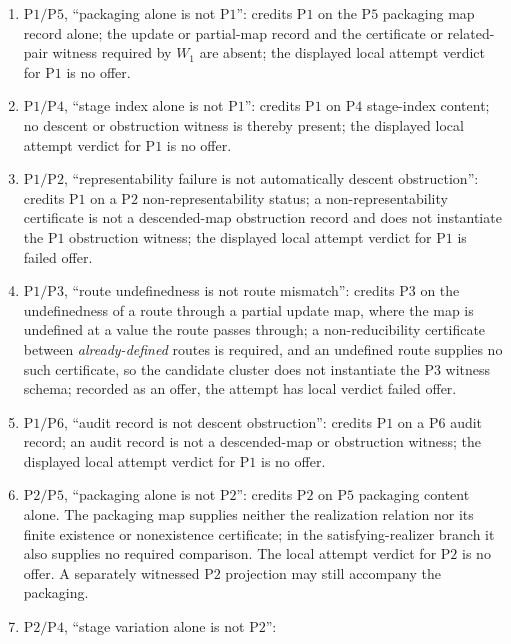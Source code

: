 \documentclass[11pt]{article}
\theoremstyle{definition}
\newcommand{\Pone}{\ensuremath{\mathrm{P1}}}
\newcommand{\Ptwo}{\ensuremath{\mathrm{P2}}}
\newcommand{\Pthree}{\ensuremath{\mathrm{P3}}}
\newcommand{\Pfour}{\ensuremath{\mathrm{P4}}}
\newcommand{\Pfive}{\ensuremath{\mathrm{P5}}}
\newcommand{\Psix}{\ensuremath{\mathrm{P6}}}
\begin{document}
\begin{enumerate}[topsep=2pt,itemsep=2pt,label=\textup{(\arabic*)}]
  \item \(\Pone{}/\Pfive{}\), ``packaging alone is not \Pone{}'': credits
    \Pone{} on the \Pfive{} packaging map record alone; the update or partial-map record and the
    certificate or related-pair witness required by \(W_1\) are absent; the displayed local attempt verdict for \Pone{}
    is no offer.
  \item \(\Pone{}/\Pfour{}\), ``stage index alone is not \Pone{}'': credits
    \Pone{} on \Pfour{} stage-index content; no descent or obstruction witness
    is thereby present; the displayed local attempt verdict for \Pone{} is no offer.
  \item \(\Pone{}/\Ptwo{}\), ``representability failure is not automatically
    descent obstruction'': credits \Pone{} on a \Ptwo{} non-representability
    status; a non-representability certificate is not a descended-map
    obstruction record and does not instantiate the \Pone{} obstruction
    witness; the displayed local attempt verdict for \Pone{} is failed offer.
  \item \(\Pone{}/\Pthree{}\), ``route undefinedness is not route mismatch'':
    credits \Pthree{} on the undefinedness of a route through a partial update
    map, where the map is undefined at a value the route passes through; a
    non-reducibility certificate between \emph{already-defined} routes is
    required, and an undefined route supplies no such certificate, so the candidate cluster does
    not instantiate the \Pthree{} witness schema; recorded as an offer, the
    attempt has local verdict failed offer.
  \item \(\Pone{}/\Psix{}\), ``audit record is not descent obstruction'':
    credits \Pone{} on a \Psix{} audit record; an audit record is not a
    descended-map or obstruction witness; the displayed local attempt verdict for \Pone{} is
    no offer.
  \item \(\Ptwo{}/\Pfive{}\), ``packaging alone is not \Ptwo{}'':
    credits \Ptwo{} on \Pfive{} packaging content alone. The packaging map
    supplies neither the realization relation nor its finite existence
    or nonexistence certificate; in the satisfying-realizer branch it also
    supplies no required comparison. The local attempt verdict for \Ptwo{}
    is no offer. A separately witnessed \Ptwo{} projection may still
    accompany the packaging.
  \item \(\Ptwo{}/\Pfour{}\), ``stage variation alone is not \Ptwo{}'':

\end{enumerate}
\end{document}
